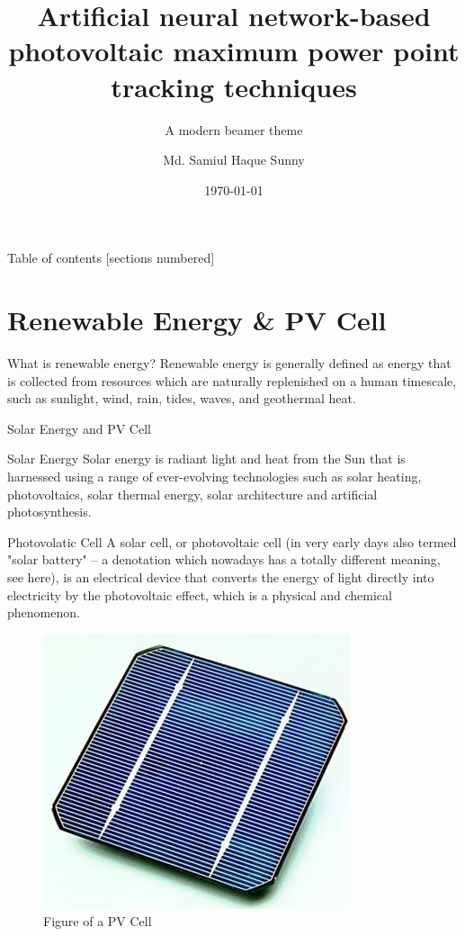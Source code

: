 \documentclass[10pt]{beamer}
\title{Artificial neural network-based photovoltaic
maximum power point tracking techniques}
\subtitle{A modern beamer theme}
\date{\today}
\author{Md. Samiul Haque Sunny}
\institute{Khulna University of Engineering \& Technology}
\begin{document}
\maketitle

\begin{frame}{Table of contents}
  [sections numbered]
  \tableofcontents[hideallsubsections]
\end{frame}

\section{Renewable Energy \& PV Cell}
\begin{frame}{What is renewable energy?}
Renewable energy is generally defined as energy that is collected from resources which are naturally replenished on a human timescale, such as sunlight, wind, rain, tides, waves, and geothermal heat.
\end{frame}

\begin{frame}[allowframebreaks]{Solar Energy and PV Cell}

\begin{alertblock}{Solar Energy}
Solar energy is radiant light and heat from the Sun that is harnessed using a range of ever-evolving technologies such as solar heating, photovoltaics, solar thermal energy, solar architecture and artificial photosynthesis.
\end{alertblock}

\begin{exampleblock}{Photovolatic Cell}
A solar cell, or photovoltaic cell (in very early days also termed "solar battery" – a denotation which nowadays has a totally different meaning, see here), is an electrical device that converts the energy of light directly into electricity by the photovoltaic effect, which is a physical and chemical phenomenon.
\end{exampleblock}

\framebreak 

\begin{figure}
		\centering
		\includegraphics[width=0.6\linewidth]{pvcell.png}
        \caption{Figure of a PV Cell}
        \label{fig:pvcell}
\end{figure}
	
\end{frame}
\end{document}
